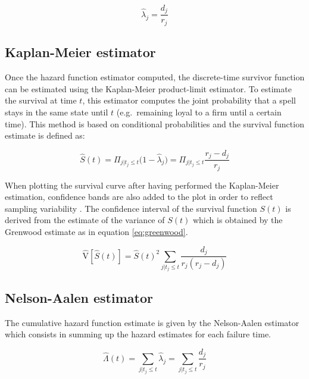 \documentclass[
]{book}
\begin{document}
\begin{equation}
  \hat{\lambda}_j = \frac{d_j}{r_j}
  \label{eq:hazest}
\end{equation}

\hypertarget{kaplan-meier-estimator}{%
\subsection{Kaplan-Meier estimator}\label{kaplan-meier-estimator}}

Once the hazard function estimator computed, the discrete-time survivor function can be estimated using the Kaplan-Meier product-limit estimator. To estimate the survival at time \(t\), this estimator computes the joint probability that a spell stays in the same state until \(t\) (e.g.~remaining loyal to a firm until a certain time). This method is based on conditional probabilities and the survival function estimate is defined as:

\begin{equation}
  \hat{S}(t) = \Pi_{j|t_j \leq t} \big(1-\hat{\lambda}_j\big) = \Pi_{j|t_j \leq t}\frac{r_j - d_j}{r_j}
  \label{eq:kaplanmeier}
\end{equation}

When plotting the survival curve after having performed the Kaplan-Meier estimation, confidence bands are also added to the plot in order to reflect sampling variability \citep{CAMERON_TRIVEDI}. The confidence interval of the survival function \(S(t)\) is derived from the estimate of the variance of \(S(t)\) which is obtained by the Grenwood estimate as in equation \eqref{eq:greenwood}.

\begin{equation}
  \hat{\mathrm{V}}[\hat{S}(t)] = \hat{S}(t)^2 \sum_{j|t_j \leq t} \frac{d_j}{r_j(r_j-d_j)}
  \label{eq:greenwood}
\end{equation}

\hypertarget{nelson-aalen-estimator}{%
\subsection{Nelson-Aalen estimator}\label{nelson-aalen-estimator}}

The cumulative hazard function estimate is given by the Nelson-Aalen estimator which consists in summing up the hazard estimates for each failure time.

\begin{equation}
  \hat{\Lambda}(t) = \sum_{j | t_j \leq t} \hat{\lambda}_{j} = \sum_{j | t_j \leq t} \frac{d_j}{r_j}
  \label{eq:nelsonaalen}
\end{equation}
\end{document}
